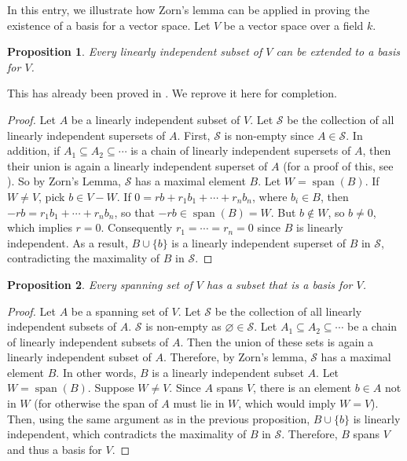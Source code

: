 \documentclass[12pt]{article}
\newtheorem{prop}{Proposition}
\begin{document}
In this entry, we illustrate how Zorn's lemma can be applied in proving the existence of a basis for a vector space.  Let $V$ be a vector space over a field $k$.

\begin{prop} Every linearly independent subset of $V$ can be extended to a basis for $V$. \end{prop}

This has already been proved in .  We reprove it here for completion.

\begin{proof}
Let $A$ be a linearly independent subset of $V$.  Let $\mathcal{S}$ be the collection of all linearly independent supersets of $A$.  First, $\mathcal{S}$ is non-empty since $A\in \mathcal{S}$.  In addition, if $A_1\subseteq A_2 \subseteq \cdots$ is a chain of linearly independent supersets of $A$, then their union is again a linearly independent superset of $A$ (for a proof of this, see ).  So by Zorn's Lemma, $\mathcal{S}$ has a maximal element $B$.  Let $W=\operatorname{span}(B)$.  If $W\ne V$, pick $b\in V-W$.  If $0=rb+r_1b_1+\cdots +r_nb_n$, where $b_i\in B$, then $-rb=r_1b_1+\cdots +r_nb_n$, so that $-rb\in \operatorname{span}(B)=W$.  But $b\notin W$, so $b\ne 0$, which implies $r=0$.  Consequently $r_1=\cdots = r_n=0$ since $B$ is linearly independent.  As a result, $B\cup \lbrace b\rbrace$ is a linearly independent superset of $B$ in $\mathcal{S}$, contradicting the maximality of $B$ in $\mathcal{S}$.
\end{proof}

\begin{prop}  Every spanning set of $V$ has a subset that is a basis for $V$. \end{prop}
\begin{proof}
Let $A$ be a spanning set of $V$.  Let $\mathcal{S}$ be the collection of all linearly independent subsets of $A$.  $\mathcal{S}$ is non-empty as $\varnothing\in \mathcal{S}$.  Let $A_1\subseteq A_2\subseteq \cdots$ be a chain of linearly independent subsets of $A$.  Then the union of these sets is again a linearly independent subset of $A$.  Therefore, by Zorn's lemma, $\mathcal{S}$ has a maximal element $B$.  In other words, $B$ is a linearly independent subset $A$.  Let $W=\operatorname{span}(B)$.  Suppose $W\ne V$.  Since $A$ spans $V$, there is an element $b\in A$ not in $W$ (for otherwise the span of $A$ must lie in $W$, which would imply $W=V$).  Then, using the same argument as in the previous proposition, $B\cup\lbrace b\rbrace$ is linearly independent, which contradicts the maximality of $B$ in $\mathcal{S}$.  Therefore, $B$ spans $V$ and thus a basis for $V$.
\end{proof}
\end{document}
